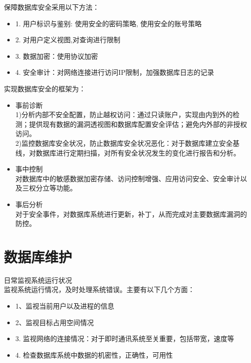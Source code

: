 保障数据库安全采用以下方法：
\begin{itemize}
    \item 1. 用户标识与鉴别: 使用安全的密码策略, 使用安全的账号策略
    \item 2. 对用户定义视图,对查询进行限制
    \item 3. 数据加密：使用协议加密
    \item 4. 安全审计：对网络连接进行访问IP限制，加强数据库日志的记录
\end{itemize}

实现数据库安全的框架为：
\begin{itemize}
    \item 事前诊断\\
    1)分析内部不安全配置，防止越权访问：通过只读账户，实现由内到外的检测；提供现有数据的漏洞透视图和数据库配置安全评估；避免内外部的非授权访问。\\
    2)监控数据库安全状况，防止数据库安全状况恶化：对于数据库建立安全基线，对数据库进行定期扫描，对所有安全状况发生的变化进行报告和分析。
    \item 事中控制 \\
    对数据库中的敏感数据加密存储、访问控制增强、应用访问安全、安全审计以及三权分立等功能。
    \item 事后分析 \\
    对于安全事件，对数据库系统进行更新，补丁，从而完成对主要数据库漏洞的防控。
    
\end{itemize}


\section{数据库维护}

日常监视系统运行状况\\

监视系统运行情况，及时处理系统错误。主要有以下几个方面：
\begin{itemize}
    

\item 1、监视当前用户以及进程的信息
\item 2、监视目标占用空间情况
\item 3. 监视网络的连接情况：对于即时通讯系统至关重要，包括带宽，速度等
\item 4. 检查数据库系统中数据的机密性，正确性，可用性

\end{itemize}

